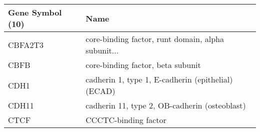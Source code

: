 \begin{tabular}{ll}
\toprule
Gene Symbol (10) &                                               Name \\
\midrule
         CBFA2T3 & core-binding factor, runt domain, alpha subunit... \\
            CBFB &                  core-binding factor, beta subunit \\
            CDH1 & cadherin 1, type 1, E-cadherin (epithelial) (ECAD) \\
           CDH11 &      cadherin 11, type 2, OB-cadherin (osteoblast) \\
            CTCF &                               CCCTC-binding factor \\
\bottomrule
\end{tabular}
